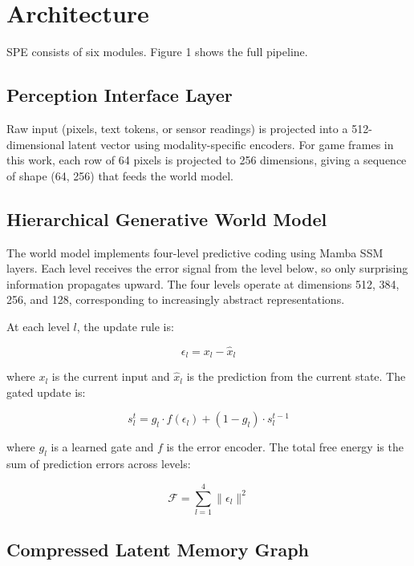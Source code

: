 \documentclass{article}
\begin{document}
\section{Architecture}

SPE consists of six modules. Figure 1 shows the full pipeline.

\subsection{Perception Interface Layer}

Raw input (pixels, text tokens, or sensor readings) is projected into a
512-dimensional latent vector using modality-specific encoders. For game
frames in this work, each row of 64 pixels is projected to 256 dimensions,
giving a sequence of shape (64, 256) that feeds the world model.

\subsection{Hierarchical Generative World Model}

The world model implements four-level predictive coding using Mamba SSM
layers. Each level receives the error signal from the level below, so
only surprising information propagates upward. The four levels operate
at dimensions 512, 384, 256, and 128, corresponding to increasingly
abstract representations.

At each level $l$, the update rule is:

\begin{equation}
\epsilon_l = x_l - \hat{x}_l
\end{equation}

where $x_l$ is the current input and $\hat{x}_l$ is the prediction from
the current state. The gated update is:

\begin{equation}
s_l^{t} = g_l \cdot f(\epsilon_l) + (1 - g_l) \cdot s_l^{t-1}
\end{equation}

where $g_l$ is a learned gate and $f$ is the error encoder. The total
free energy is the sum of prediction errors across levels:

\begin{equation}
\mathcal{F} = \sum_{l=1}^{4} \|\epsilon_l\|^2
\end{equation}

\subsection{Compressed Latent Memory Graph}
\end{document}
